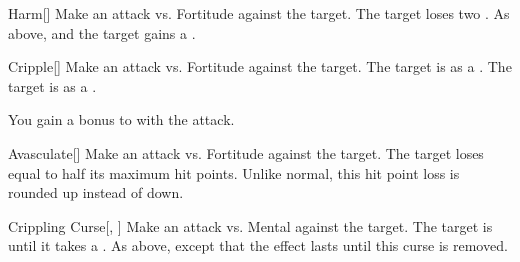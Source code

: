 \lowercase{\hypertarget{spell:Harm}{}}\label{spell:Harm}
\begin{freeability}[Rank 5]{\hypertarget{spell:Harm}{Harm}}[]
Make an attack vs. Fortitude against the target.
\hit The target loses two .
\crit As above, and the target gains a .
\end{freeability}
\vspace{0.25em}



\lowercase{\hypertarget{spell:Cripple}{}}\label{spell:Cripple}
\begin{freeability}[Rank 6]{\hypertarget{spell:Cripple}{Cripple}}[]
Make an attack vs. Fortitude against the target.
\hit The target is  as a .
\crit The target is  as a .

\rankline
{} You gain a  bonus to  with the attack.
\end{freeability}
\vspace{0.25em}



\lowercase{\hypertarget{spell:Avasculate}{}}\label{spell:Avasculate}
\begin{freeability}[Rank 8]{\hypertarget{spell:Avasculate}{Avasculate}}[]
Make an attack vs. Fortitude against the target.
\hit The target loses  equal to half its maximum hit points.
Unlike normal, this hit point loss is rounded up instead of down.
\end{freeability}
\vspace{0.25em}



\lowercase{\hypertarget{spell:Crippling Curse}{}}\label{spell:Crippling Curse}
\begin{freeability}[Rank 8]{\hypertarget{spell:Crippling Curse}{Crippling Curse}}[, ]
Make an attack vs. Mental against the target.
\hit The target is  until it takes a .
\crit As above, except that the effect lasts until this curse is removed.
\end{freeability}
\vspace{0.25em}



